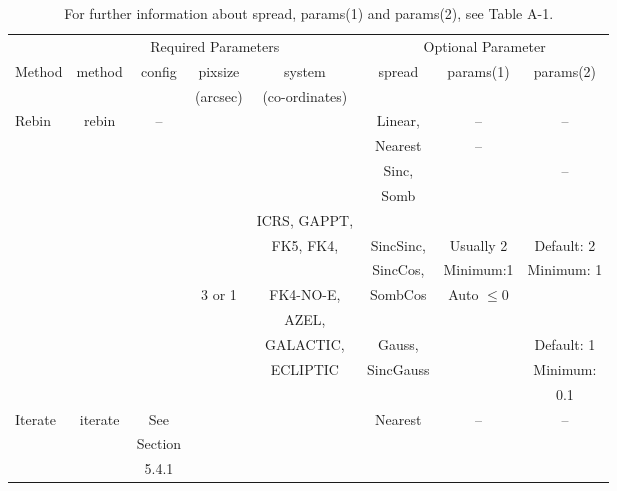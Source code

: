 \documentclass[twoside,11pt]{article}
\renewcommand{\_}{\texttt{\symbol{95}}}
\begin{document}
\begin{table}
\begin{tabular}{lccccccc}
\hline
        & \multicolumn{4}{c}{Required Parameters}           & \multicolumn{3}{c}{Optional Parameter} \\
Method & method    &  config   &    pixsize   &   system         &  spread    & params(1) & params(2) \\
       &           &           &   (arcsec)   &  (co-ordinates)  &            &           & \\
\hline
Rebin  & rebin     &  --       &              &                  &  Linear,   &   --      & -- \\
       &           &           &              &                  &  Nearest   &     --       & \\
       &           &           &              &                  &  Sinc,     &              &   -- \\
       &           &           &              &                  &  Somb      &              & \\
       &           &           &              &   ICRS, GAPPT,   &            &              & \\
       &           &           &              &   FK5, FK4,      &  SincSinc, &  Usually 2   &  Default: 2\\
       &           &           &              &                  &  SincCos,  &  Minimum:1   &  Minimum: 1\\
       &           &           &      3 or 1  &   FK4-NO-E,      &  SombCos   & Auto $\leq$0 & \\
       &           &           &              &   AZEL,          &            &              & \\
       &           &           &              &   GALACTIC,      &  Gauss,    &              &   Default: 1\\
       &           &           &              &   ECLIPTIC       &  SincGauss &              &   Minimum:\\
       &           &           &              &                  &            &              &           0.1\\
\hline
Iterate& iterate   &    See    &              &                  &  Nearest   &     --       &   -- \\
       &           &    Section&              &                  &            &              & \\
       &           &    5.4.1  &              &                  &            &              & \\
\hline
\end{tabular}
\caption{For further information about spread, params(1) and params(2), see Table A-1.}
\end{table}
\end{document}
